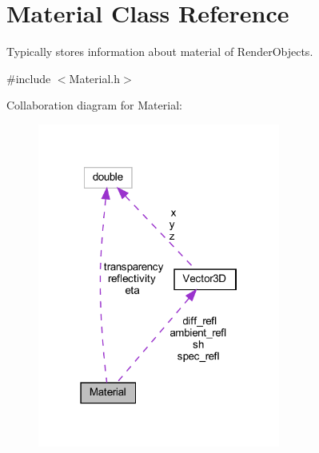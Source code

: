 \hypertarget{classMaterial}{}\section{Material Class Reference}
\label{classMaterial}


Typically stores information about material of Render\+Objects.  




{\ttfamily \#include $<$Material.\+h$>$}



Collaboration diagram for Material\+:
\nopagebreak
\begin{figure}[H]
\begin{center}
\leavevmode
\includegraphics[width=226pt]{classMaterial__coll__graph}
\end{center}
\end{figure}
